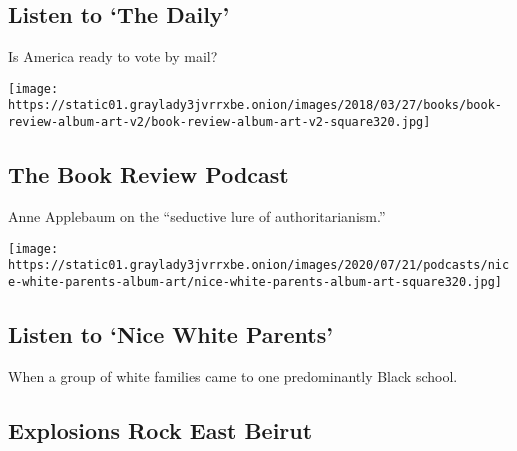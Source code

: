 \href{/2020/08/04/podcasts/the-daily/mail-in-voting-president-trump.html}{}

\hypertarget{listen-to-the-daily}{%
\subsection{Listen to `The Daily'}\label{listen-to-the-daily}}

Is America ready to vote by mail?

\href{/2020/07/31/books/review/podcast-twilight-democracy-anne-applebaum-eat-buddha-barbara-demick.html}{}

\texttt{[image: https://static01.graylady3jvrrxbe.onion/images/2018/03/27/books/book-review-album-art-v2/book-review-album-art-v2-square320.jpg]}

\href{/2020/07/31/books/review/podcast-twilight-democracy-anne-applebaum-eat-buddha-barbara-demick.html}{}

\hypertarget{the-book-review-podcast}{%
\subsection{The Book Review Podcast}\label{the-book-review-podcast}}

Anne Applebaum on the ``seductive lure of authoritarianism.''

\href{/2020/07/30/podcasts/nice-white-parents-serial.html}{}

\texttt{[image: https://static01.graylady3jvrrxbe.onion/images/2020/07/21/podcasts/nice-white-parents-album-art/nice-white-parents-album-art-square320.jpg]}

\href{/2020/07/30/podcasts/nice-white-parents-serial.html}{}

\hypertarget{listen-to-nice-white-parents}{%
\subsection{Listen to `Nice White
Parents'}\label{listen-to-nice-white-parents}}

When a group of white families came to one predominantly Black school.

\href{/2020/08/04/world/middleeast/beirut-explosion-blast.html}{}

\hypertarget{explosions-rock-east-beirut}{%
\subsection{Explosions Rock East
Beirut}\label{explosions-rock-east-beirut}}

